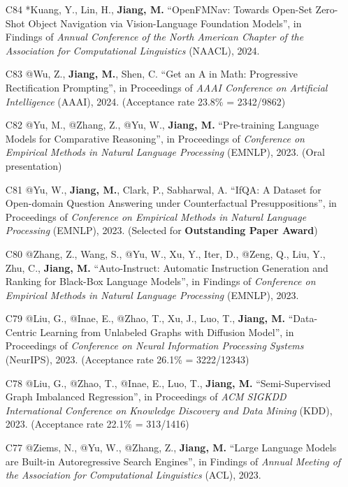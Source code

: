 \documentclass[10pt]{article}
\newenvironment{myindentpar}[1]%
{\begin{list}{}%
         {\setlength{\leftmargin}{#1}}%
         \item[]%
}
{\end{list}}
\newcounter{list}
\begin{document}
\begin{myindentpar}{0.00cm}
\begin{enumerate}[leftmargin=.5cm]
\item[C84] *Kuang, Y., Lin, H., \textbf{Jiang, M.} ``OpenFMNav: Towards Open-Set Zero-Shot Object Navigation via Vision-Language Foundation Models'', in Findings of \textit{Annual Conference of the North American Chapter of the Association for Computational Linguistics} (NAACL), 2024.

\item[C83] @Wu, Z., \textbf{Jiang, M.}, Shen, C. ``Get an A in Math: Progressive Rectification Prompting'', in Proceedings of \textit{AAAI Conference on Artificial Intelligence} (AAAI), 2024. (Acceptance rate 23.8\% = 2342/9862)
		
\item[C82] @Yu, M., @Zhang, Z., @Yu, W., \textbf{Jiang, M.} ``Pre-training Language Models for Comparative Reasoning'', in Proceedings of \textit{Conference on Empirical Methods in Natural Language Processing} (EMNLP), 2023. (Oral presentation)

\item[C81] @Yu, W., \textbf{Jiang, M.}, Clark, P., Sabharwal, A. ``IfQA: A Dataset for Open-domain Question Answering under Counterfactual Presuppositions'', in Proceedings of \textit{Conference on Empirical Methods in Natural Language Processing} (EMNLP), 2023. (Selected for \textbf{Outstanding Paper Award})

\item[C80] @Zhang, Z., Wang, S., @Yu, W., Xu, Y., Iter, D., @Zeng, Q., Liu, Y., Zhu, C., \textbf{Jiang, M.} ``Auto-Instruct: Automatic Instruction Generation and Ranking for Black-Box Language Models'', in Findings of \textit{Conference on Empirical Methods in Natural Language Processing} (EMNLP), 2023.

\item[C79] @Liu, G., @Inae, E., @Zhao, T., Xu, J., Luo, T., \textbf{Jiang, M.} ``Data-Centric Learning from Unlabeled Graphs with Diffusion Model'', in Proceedings of \textit{Conference on Neural Information Processing Systems} (NeurIPS), 2023. (Acceptance rate 26.1\% = 3222/12343)

\item[C78] @Liu, G., @Zhao, T., @Inae, E., Luo, T., \textbf{Jiang, M.} ``Semi-Supervised Graph Imbalanced Regression'', in Proceedings of \textit{ACM SIGKDD International Conference on Knowledge Discovery and Data Mining} (KDD), 2023. (Acceptance rate 22.1\% = 313/1416)
		
\item[C77] @Ziems, N., @Yu, W., @Zhang, Z., \textbf{Jiang, M.} ``Large Language Models are Built-in Autoregressive Search Engines'', in Findings of \textit{Annual Meeting of the Association for Computational Linguistics} (ACL), 2023.


\end{enumerate}
\end{myindentpar}
\end{document}
